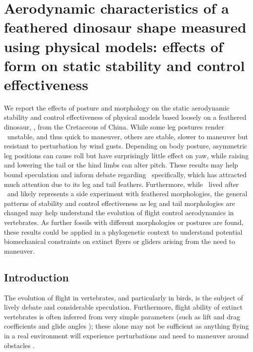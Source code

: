 
\chapter{Aerodynamic characteristics of a feathered dinosaur shape measured using physical models: effects of form on static stability and control effectiveness}
\label{ch:2}

We report the effects of posture and morphology on the static aerodynamic stability and control effectiveness of physical models based loosely on a feathered dinosaur, \Microraptorgui, from the Cretaceous of China.  While some leg postures render \Mgui\ unstable, and thus quick to maneuver, others are stable, slower to maneuver but resistant to perturbation by wind gusts.  Depending on body posture, asymmetric leg positions can cause roll but have surprisingly little effect on yaw, while raising and lowering the tail or the hind limbs can alter pitch.  These results may help bound speculation and inform debate regarding \Mgui\ specifically, which has attracted much attention due to its leg and tail feathers.  Furthermore, while \Mgui\ lived after \Archaeopteryx\ and likely represents a side experiment with feathered morphologies, the general patterns of stability and control effectiveness as leg and tail morphologies are changed may help understand the evolution of flight control aerodynamics in vertebrates.  As further fossils with different morphologies or postures are found, these results could be applied in a phylogenetic context to understand potential biomechanical constraints on extinct flyers or gliders arising from the need to maneuver. 

\section{Introduction}
The evolution of flight in vertebrates, and particularly in birds, is the subject of lively debate and considerable speculation.  Furthermore, flight ability of extinct vertebrates is often inferred from very simple parameters (such as lift and drag coefficients and glide angles \cite{Emerson:1990, Emerson:1990b}); these alone may not be sufficient as anything flying in a real environment will experience perturbations and need to maneuver around obstacles \cite{Dudley:2012}.  

